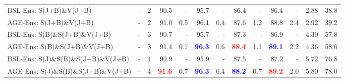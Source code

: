 \documentclass[journal,comsoc]{IEEEtran}
\def\ange{AGE}
\begin{document}
\begin{table*}[t]
{\begin{tabular}{l c c | rrrr | rrrr | r r}
\midrule 
\rowcolor{Gray!30}
BSL-Ens: S(J+B)\&V(J+B) & - & 2 & 90.5 & - & 95.7 & - & 86.4 & - & 86.4 & - & 2.88 & 38.8 \\ 
\ange{}-Ens: S(J+B)\&V(J+B) & - & 2 & 91.0 & 0.5 & 96.1 & 0.4 & 87.6 & 1.2 &  88.8 & 2.4 & 2.92 & 39.2 \\ 
\midrule 
\rowcolor{Gray!30}
BSL-Ens: S(B)\&S(J+B)\&V(J+B) & - & 3 & 90.7 & - & 95.7 & - & 87.3 & - & 86.9 & - & 4.30 & 57.8 \\ 
\ange{}-Ens: S(B)\&S(J+B)\&V(J+B) & - & 3 & 91.4 & 0.7 & \textbf{\textcolor{blue}{96.3}} & 0.6 & \textbf{\textcolor{red}{88.4}} & 1.1 & \textbf{\textcolor{blue}{89.1}} & 2.2 & 4.36 & 58.6 \\ 
\midrule 
\rowcolor{Gray!30}
BSL-Ens: S(J)\&S(B)\&S(J+B)\&V(J+B) & - & 4 & 90.9 & - & 95.9 & - & 87.5 & - & 87.2 & - & 5.72 & 76.8 \\ 
\ange{}-Ens: S(J)\&S(B)\&S(J+B)\&V(J+B) & - & 4 & \textbf{\textcolor{red}{91.6}} & 0.7 & \textbf{\textcolor{blue}{96.3}} & 0.4 & \textbf{\textcolor{blue}{88.2}} & 0.7 & \textbf{\textcolor{red}{89.2}} & 2.0 & 5.80 & 78.0 \\ 
\bottomrule
\end{tabular}
}
\label{tab:compare_with_sota}
\end{table*} \begin{table}[t]
\centering
\caption{Evaluation results on ensembling with angular features. Ens is the ensembling. Jnt and Bon represent the joint and bone features respectively. The red bold number highlights the highest prediction accuracy. Acc is the improvement in accuracy. } 
\label{table:ang_feature_ens}
\end{table}
\end{document}
